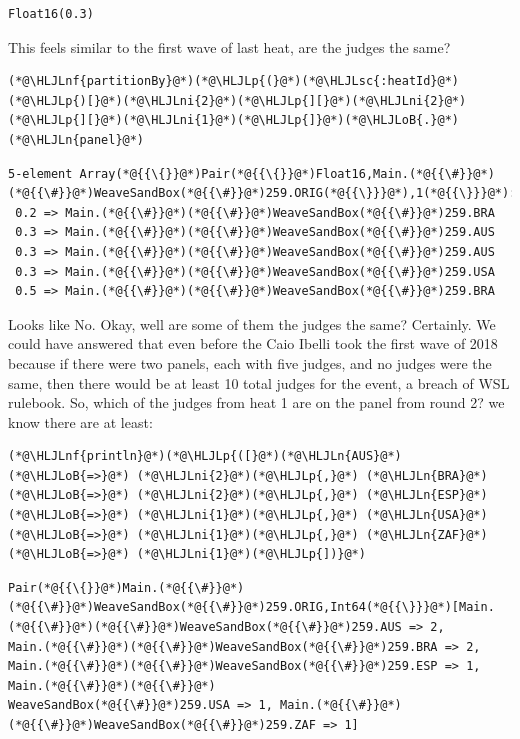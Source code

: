 \documentclass[12pt,a4paper]{article}
\newcommand{\HLJLn}[1]{#1}
\newcommand{\HLJLnf}[1]{\textcolor[RGB]{66,102,213}{#1}}
\newcommand{\HLJLsc}[1]{\textcolor[RGB]{201,61,57}{#1}}
\newcommand{\HLJLni}[1]{\textcolor[RGB]{59,151,46}{#1}}
\newcommand{\HLJLoB}[1]{\textcolor[RGB]{102,102,102}{\textbf{#1}}}
\newcommand{\HLJLp}[1]{#1}
\begin{document}
\begin{lstlisting}
Float16(0.3)
\end{lstlisting}


This feels similar to the first wave of last heat, are the judges the same?


\begin{lstlisting}
(*@\HLJLnf{partitionBy}@*)(*@\HLJLp{(}@*)(*@\HLJLsc{:heatId}@*)(*@\HLJLp{)[}@*)(*@\HLJLni{2}@*)(*@\HLJLp{][}@*)(*@\HLJLni{2}@*)(*@\HLJLp{][}@*)(*@\HLJLni{1}@*)(*@\HLJLp{]}@*)(*@\HLJLoB{.}@*)(*@\HLJLn{panel}@*)
\end{lstlisting}

\begin{lstlisting}
5-element Array(*@{{\{}}@*)Pair(*@{{\{}}@*)Float16,Main.(*@{{\#}}@*)(*@{{\#}}@*)WeaveSandBox(*@{{\#}}@*)259.ORIG(*@{{\}}}@*),1(*@{{\}}}@*):
 0.2 => Main.(*@{{\#}}@*)(*@{{\#}}@*)WeaveSandBox(*@{{\#}}@*)259.BRA
 0.3 => Main.(*@{{\#}}@*)(*@{{\#}}@*)WeaveSandBox(*@{{\#}}@*)259.AUS
 0.3 => Main.(*@{{\#}}@*)(*@{{\#}}@*)WeaveSandBox(*@{{\#}}@*)259.AUS
 0.3 => Main.(*@{{\#}}@*)(*@{{\#}}@*)WeaveSandBox(*@{{\#}}@*)259.USA
 0.5 => Main.(*@{{\#}}@*)(*@{{\#}}@*)WeaveSandBox(*@{{\#}}@*)259.BRA
\end{lstlisting}


Looks like No. Okay, well are some of them the judges the same? Certainly. We could have answered that even before the Caio Ibelli took the first wave of 2018 because if there were two panels, each with five judges, and no judges were the same, then there would be at least 10 total judges for the event, a breach of WSL rulebook. So, which of the judges from heat 1 are on the panel from round 2? we know there are at least:


\begin{lstlisting}
(*@\HLJLnf{println}@*)(*@\HLJLp{([}@*)(*@\HLJLn{AUS}@*) (*@\HLJLoB{=>}@*) (*@\HLJLni{2}@*)(*@\HLJLp{,}@*) (*@\HLJLn{BRA}@*) (*@\HLJLoB{=>}@*) (*@\HLJLni{2}@*)(*@\HLJLp{,}@*) (*@\HLJLn{ESP}@*) (*@\HLJLoB{=>}@*) (*@\HLJLni{1}@*)(*@\HLJLp{,}@*) (*@\HLJLn{USA}@*) (*@\HLJLoB{=>}@*) (*@\HLJLni{1}@*)(*@\HLJLp{,}@*) (*@\HLJLn{ZAF}@*) (*@\HLJLoB{=>}@*) (*@\HLJLni{1}@*)(*@\HLJLp{])}@*)
\end{lstlisting}

\begin{lstlisting}
Pair(*@{{\{}}@*)Main.(*@{{\#}}@*)(*@{{\#}}@*)WeaveSandBox(*@{{\#}}@*)259.ORIG,Int64(*@{{\}}}@*)[Main.(*@{{\#}}@*)(*@{{\#}}@*)WeaveSandBox(*@{{\#}}@*)259.AUS => 2, 
Main.(*@{{\#}}@*)(*@{{\#}}@*)WeaveSandBox(*@{{\#}}@*)259.BRA => 2, Main.(*@{{\#}}@*)(*@{{\#}}@*)WeaveSandBox(*@{{\#}}@*)259.ESP => 1, Main.(*@{{\#}}@*)(*@{{\#}}@*)
WeaveSandBox(*@{{\#}}@*)259.USA => 1, Main.(*@{{\#}}@*)(*@{{\#}}@*)WeaveSandBox(*@{{\#}}@*)259.ZAF => 1]
\end{lstlisting}
\end{document}
